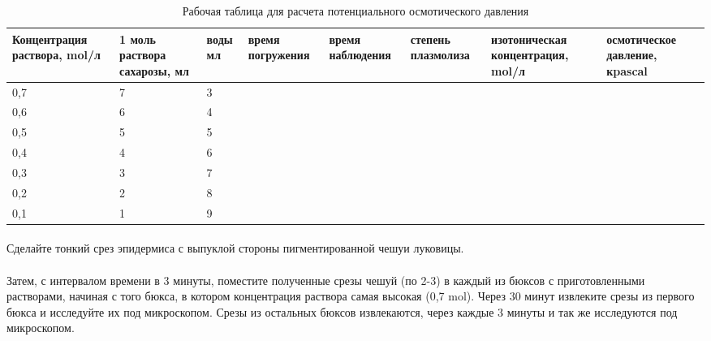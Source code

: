 \begin{table}[!h]

\label{pot_osm_press_work}
\caption{Рабочая таблица для расчета потенциального осмотического давления}
\begin{tabular}{|p{2cm}|p{2cm}|p{1.5cm}|p{1.5cm}|p{1.5cm}|p{1.5cm}|p{1.5cm}|p{1.5cm}|}


\hline Концентра\-ция раствора, \- \gls{mol}/л & 1 моль раствора сахарозы, мл & воды мл & время погружения & время наблюдения & степень плазмолиза & изотони\-ческая концентра\-ция,\- \gls{mol}/л & осмоти\-ческое давление, к\gls{pascal} \\
\hline 0,7 & 7 & 3 &  &  &  & &  \\
\hline 0,6 & 6 & 4 &  &  &  & &  \\
\hline 0,5 & 5 & 5 &  &  &  & &  \\
\hline 0,4 & 4 & 6 &  &  &  & &  \\
\hline 0,3 & 3 & 7 &  &  &  & &  \\
\hline 0,2 & 2 & 8 &  &  &  & &  \\
\hline 0,1 & 1 & 9 &  &  &  & &  \\
\hline

\end{tabular}

\end{table}

\paragraph*{}Сделайте тонкий срез эпидермиса с выпуклой стороны пигментированной чешуи луковицы.

\paragraph*{}Затем, с интервалом времени в 3 минуты, поместите полученные срезы чешуй (по 2-3) в каждый из бюксов с приготовленными растворами, начиная с того бюкса, в котором концентрация раствора самая высокая (0,7 \gls{mol}). 
Через 30 минут извлеките срезы из первого бюкса и исследуйте их под микроскопом. Срезы из остальных бюксов извлекаются, через каждые 3 минуты и так же исследуются под микроскопом. 

